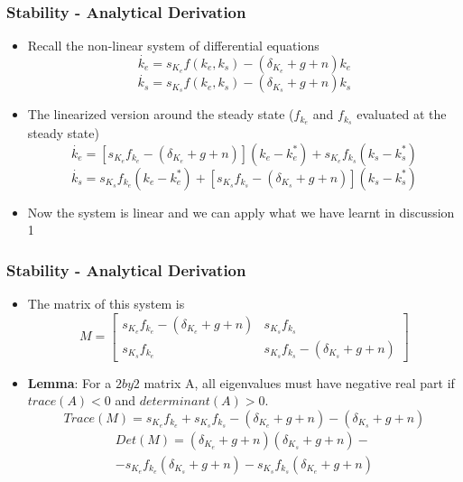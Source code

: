 \documentclass[11pt]{beamer}
\begin{document}

\begin{frame}
\frametitle{Stability - Analytical Derivation}
\begin{itemize}\itemsep2ex
	\item Recall the non-linear system of differential equations
\begin{equation*}
\dot{k_e} = s_{K_e}f(k_e, k_s)  - ( \delta_{K_e} + g + n) k_e
\end{equation*}
\begin{equation*}
\dot{k_s} = s_{K_s}f(k_e, k_s)  - ( \delta_{K_s} + g + n) k_s
\end{equation*}
	\item The linearized version around the steady state ($f_{k_e}$ and $f_{k_s}$ evaluated at the steady state)
\begin{equation*}
\dot{k_e} = [ s_{K_e}f_{k_e}  - ( \delta_{K_e} + g + n) ] (k_e - k_e^*) + s_{K_e}f_{k_s} (k_s - k_s^*)
\end{equation*}
\begin{equation*}
\dot{k_s} = s_{K_s}f_{k_e} (k_e - k_e^*) + [ s_{K_s}f_{k_s}  - ( \delta_{K_s} + g + n) ] (k_s - k_s^*)
\end{equation*}
	\item Now the system is linear and we can apply what we have learnt in discussion 1
\end{itemize}
\end{frame}


\begin{frame}
\frametitle{Stability - Analytical Derivation}
\begin{itemize}\itemsep2ex
	\item The matrix of this system is
\[
M=
  \begin{bmatrix}
    s_{K_e}f_{k_e}  - ( \delta_{K_e} + g + n) & s_{K_s}f_{k_s}  \\
    s_{K_s}f_{k_e} & s_{K_s}f_{k_s}  - ( \delta_{K_s} + g + n)
  \end{bmatrix}
\]
	\item \textbf{Lemma}: For a $2by2$ matrix A, all eigenvalues must have negative real part if $trace(A)<0$ and $determinant(A)>0$.
\begin{equation*}
Trace(M) = s_{K_e}f_{k_e} + s_{K_s}f_{k_s}  - ( \delta_{K_e} + g + n)  - ( \delta_{K_s} + g + n)
\end{equation*}
\begin{multline*}
Det(M) = ( \delta_{K_e} + g + n) ( \delta_{K_s} + g + n) - \\ - s_{K_e}f_{k_e}( \delta_{K_s} + g + n) - s_{K_s}f_{k_s} ( \delta_{K_e} + g + n)
\end{multline*}
\end{itemize}
\end{frame}
\end{document}
